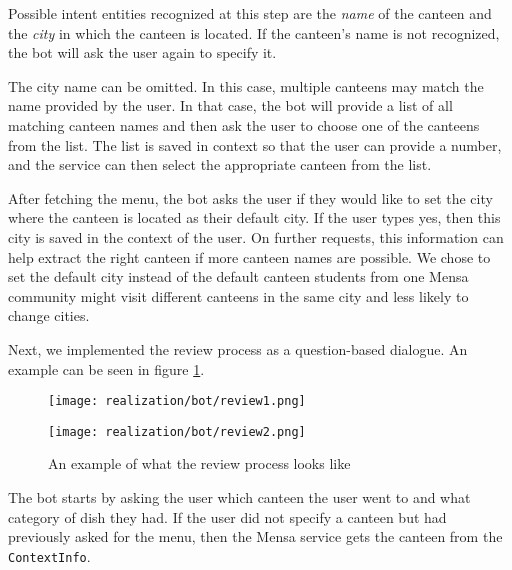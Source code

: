 Possible intent entities recognized at this step are the \emph{name} of the canteen and the \emph{city} in which the canteen is located.
If the canteen's name is not recognized, the bot will ask the user again to specify it. 

The city name can be omitted. In this case, multiple canteens may match the name provided by the user. In that case, the bot will provide a list of all matching canteen names and then ask the user to choose one of the canteens from the list. The list is saved in context so that the user can provide a number, and the service can then select the appropriate canteen from the list.

After fetching the menu, the bot asks the user if they would like to set the city where the canteen is located as their default city. If the user types yes, then this city is saved in the context of the user. On further requests, this information can help extract the right canteen if more canteen names are possible. 
We chose to set the default city instead of the default canteen students from one Mensa community might visit different canteens in the same city and less likely to change cities. 

Next, we implemented the review process as a question-based dialogue. An example can be seen in figure \ref{fig:addReview}.


\begin{figure}[h]
    \begin{minipage}{0.5\textwidth}
        \texttt{[image: realization/bot/review1.png]} 
    \end{minipage}
    \begin{minipage}{0.5\textwidth}
        \texttt{[image: realization/bot/review2.png]}
        
    \end{minipage}
    \caption{An example of what the review process looks like}
    \label{fig:addReview}
\end{figure}

The bot starts by asking the user which canteen the user went to and what category of dish they had. If the user did not specify a canteen but had previously asked for the menu, then the Mensa service gets the canteen from the \texttt{ContextInfo}. 

